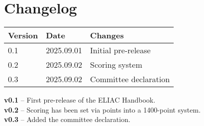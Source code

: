 
\section*{Changelog}

\begin{tabular}{lll}
\toprule
Version & Date & Changes \\ \midrule
0.1 & 2025.09.01 & Initial pre-release \\ \midrule
0.2 & 2025.09.02 & Scoring system\\ \midrule
0.3 & 2025.09.02 & Committee declaration\\ \bottomrule
\end{tabular}

\vspace{1cm}

\noindent\textbf{v0.1} – First pre-release of the ELIAC Handbook.\\
\noindent\textbf{v0.2} – Scoring has been set via points into a 1400-point system.\\
\noindent\textbf{v0.3} – Added the committee declaration.
